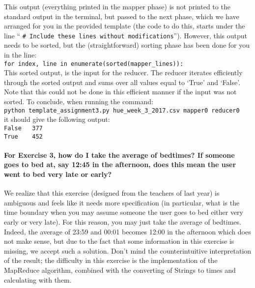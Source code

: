 \documentclass[a4paper]{report}
\theoremstyle{definition}
\begin{document}
\noindent This output (everything printed in the mapper phase) is not printed to the standard output in the terminal, but passed to the next phase, which we have arranged for you in the provided template (the code to do this, starts under the line ``
\texttt{\# Include these lines without modifications}''). However, this output needs to be sorted, but the (straightforward) sorting phase has been done for you in the line:\\

\noindent \texttt{for index, line in enumerate(sorted(mapper\_lines)):} \\

\noindent This sorted output, is the input for the reducer. The reducer iterates efficiently through the sorted output and sums over all values equal to `True' and `False'. Note that this could not be done in this efficient manner if the input was not sorted. To conclude, when running the command:\\

\noindent \texttt{python template\_assignment3.py hue\_week\_3\_2017.csv mapper0 reducer0}\\

\noindent it should give the following output:\\

\noindent \texttt{False~~~377}\\
\noindent \texttt{True~~~~452}\\

\paragraph{For Exercise 3, how do I take the average of bedtimes? If someone goes to bed at, say 12:45 in the afternoon, does this mean the user went to bed very late or early?}
We realize that this exercise (designed from the teachers of last year) is ambiguous and feels like it needs more specification (in particular, what is the time boundary when you may assume someone the user goes to bed either very early or very late). For this reason, you may just take the average of bedtimes. Indeed, the average of 23:59 and 00:01 becomes 12:00 in the afternoon which does not make sense, but due to the fact that some information in this exercise is missing, we accept such a solution. Don't mind the counterintuitive interpretation of the result; the difficulty in this exercise is the implementation of the MapReduce algorithm, combined with the converting of Strings to times and calculating with them.
\end{document}
